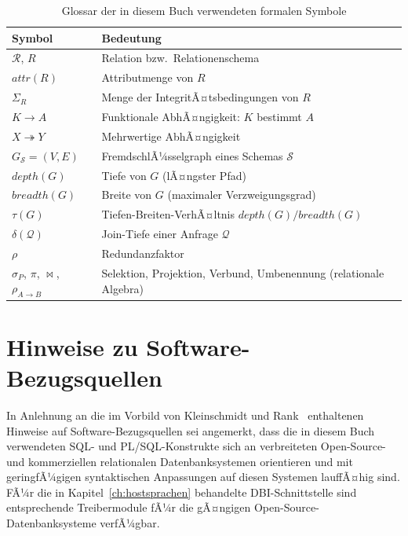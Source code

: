﻿\documentclass[a4paper,12pt]{report}
\theoremstyle{definition}
\theoremstyle{remark}
\newcommand{\R}{\mathcal{R}}
\newcommand{\att}{\mathit{attr}}
\newcommand{\depth}{\mathit{depth}}
\newcommand{\breadth}{\mathit{breadth}}
\begin{document}
\begin{table}[H]
\centering
\small
\begin{tabular}{@{}lp{10cm}@{}}
\toprule
\textbf{Symbol} & \textbf{Bedeutung} \\
\midrule
$\R$, $R$ & Relation bzw.\ Relationenschema \\
$\att(R)$ & Attributmenge von $R$ \\
$\Sigma_R$ & Menge der IntegritÃ¤tsbedingungen von $R$ \\
$K \to A$ & Funktionale AbhÃ¤ngigkeit: $K$ bestimmt $A$ \\
$X \twoheadrightarrow Y$ & Mehrwertige AbhÃ¤ngigkeit \\
$G_{\mathcal{S}} = (V,E)$ & FremdschlÃ¼sselgraph eines Schemas $\mathcal{S}$ \\
$\depth(G)$ & Tiefe von $G$ (lÃ¤ngster Pfad) \\
$\breadth(G)$ & Breite von $G$ (maximaler Verzweigungsgrad) \\
$\tau(G)$ & Tiefen-Breiten-VerhÃ¤ltnis $\depth(G)/\breadth(G)$ \\
$\delta(\mathcal{Q})$ & Join-Tiefe einer Anfrage $\mathcal{Q}$ \\
$\rho$ & Redundanzfaktor \\
$\sigma_P$, $\pi$, $\Join$, $\rho_{A\to B}$ & Selektion, Projektion, Verbund, Umbenennung (relationale Algebra) \\
\bottomrule
\end{tabular}
\caption{Glossar der in diesem Buch verwendeten formalen Symbole}
\end{table}

\section{Hinweise zu Software-Bezugsquellen}

In Anlehnung an die im Vorbild von Kleinschmidt und
Rank~\cite{Kleinschmidt2002} enthaltenen Hinweise auf
Software-Bezugsquellen sei angemerkt, dass die in diesem Buch
verwendeten SQL- und PL/SQL-Konstrukte sich an verbreiteten
Open-Source- und kommerziellen relationalen Datenbanksystemen
orientieren und mit geringfÃ¼gigen syntaktischen Anpassungen auf diesen
Systemen lauffÃ¤hig sind. FÃ¼r die in Kapitel~\ref{ch:hostsprachen}
behandelte DBI-Schnittstelle sind entsprechende Treibermodule fÃ¼r die
gÃ¤ngigen Open-Source-Datenbanksysteme verfÃ¼gbar.
\end{document}

